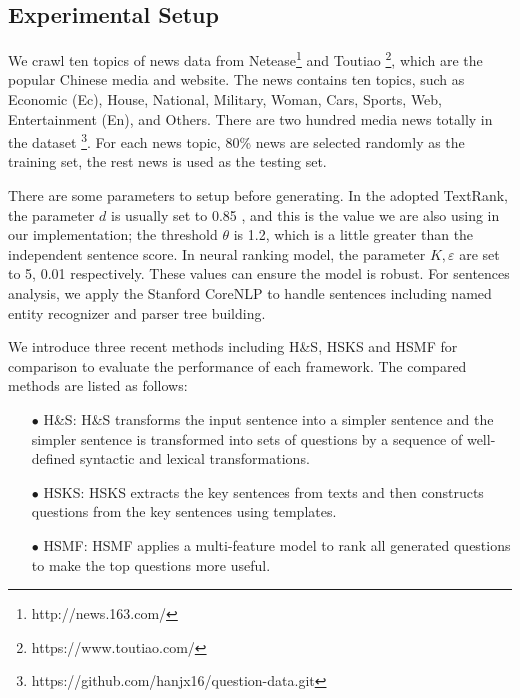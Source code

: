 \documentclass[runningheads,UTF8,article]{comsis2}
\newcommand\revised[1]{{\color{red} #1}}
\begin{document}
	\subsection{Experimental Setup}
	We crawl ten topics of news data from Netease\footnote{http://news.163.com/} and Toutiao \footnote{https://www.toutiao.com/}, which are the popular Chinese media and website. The news contains ten topics, such as Economic (Ec), House, National, Military, Woman, Cars, Sports, Web, Entertainment (En), and Others. \revised{There are two hundred media news totally in the dataset \footnote{https://github.com/hanjx16/question-data.git}.} For each news topic, 80\% news are selected randomly as the training set, the rest news is used as the testing set.
	
	There are some parameters to setup before generating. In the adopted TextRank, the parameter $ d $ is usually set to 0.85 \cite{textrank}, and this is the value we are also using in our implementation; the threshold $ \theta $ is 1.2, which is a little greater than the independent sentence score. 
	In neural ranking model, the parameter $ K,\varepsilon$ are set to 5, 0.01 \cite{neural} respectively. These values can ensure the model is robust.
	For sentences analysis, we apply the Stanford CoreNLP \cite{stanford} to handle sentences including named entity recognizer and parser tree building. 
	
	\revised{
	We introduce three recent methods including H\&S, HSKS and HSMF for comparison to evaluate the performance of each framework. The compared methods are listed as follows:
	\begin{itemize}
		\item[$\bullet$]{H\&S: H\&S transforms the input sentence into a simpler sentence and the simpler sentence is transformed into sets of questions by a sequence of well-defined syntactic and lexical transformations.\cite{heilman2010good}} 
		\item[$\bullet$]{HSKS: HSKS extracts  the key sentences from texts and then constructs questions from the key sentences using templates.}
		\item[$\bullet$]{HSMF: HSMF applies a multi-feature model to rank all generated questions to make the top questions more useful.}
	\end{itemize}
}
	
\end{document}
